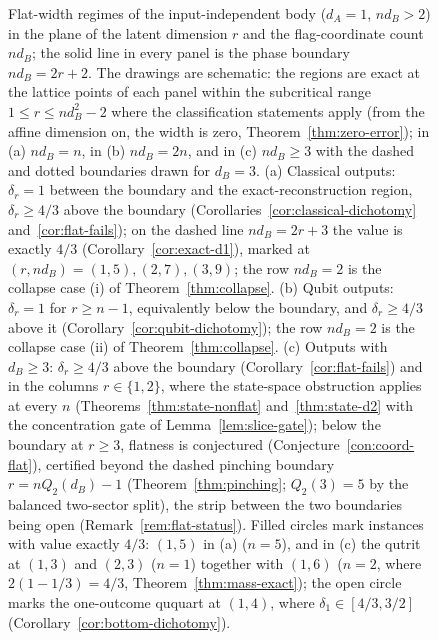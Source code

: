 \documentclass[11pt,a4paper]{article}
\begin{document}
\begin{figure}[t]
\caption{Flat-width regimes of the input-independent body ($d_A=1$, $nd_B>2$) in the plane of the latent dimension $r$ and the flag-coordinate count $nd_B$; the solid line in every panel is the phase boundary $nd_B=2r+2$. The drawings are schematic: the regions are exact at the lattice points of each panel within the subcritical range $1\le r\le nd_B^2-2$ where the classification statements apply (from the affine dimension on, the width is zero, Theorem~\ref{thm:zero-error}); in (a) $nd_B=n$, in (b) $nd_B=2n$, and in (c) $nd_B\ge3$ with the dashed and dotted boundaries drawn for $d_B=3$. (a) Classical outputs: $\delta_r=1$ between the boundary and the exact-reconstruction region, $\delta_r\ge4/3$ above the boundary (Corollaries~\ref{cor:classical-dichotomy} and~\ref{cor:flat-fails}); on the dashed line $nd_B=2r+3$ the value is exactly $4/3$ (Corollary~\ref{cor:exact-d1}), marked at $(r,nd_B)=(1,5),(2,7),(3,9)$; the row $nd_B=2$ is the collapse case (i) of Theorem~\ref{thm:collapse}. (b) Qubit outputs: $\delta_r=1$ for $r\ge n-1$, equivalently below the boundary, and $\delta_r\ge4/3$ above it (Corollary~\ref{cor:qubit-dichotomy}); the row $nd_B=2$ is the collapse case (ii) of Theorem~\ref{thm:collapse}. (c) Outputs with $d_B\ge3$: $\delta_r\ge4/3$ above the boundary (Corollary~\ref{cor:flat-fails}) and in the columns $r\in\{1,2\}$, where the state-space obstruction applies at every $n$ (Theorems~\ref{thm:state-nonflat} and~\ref{thm:state-d2} with the concentration gate of Lemma~\ref{lem:slice-gate}); below the boundary at $r\ge3$, flatness is conjectured (Conjecture~\ref{con:coord-flat}), certified beyond the dashed pinching boundary $r=nQ_2(d_B)-1$ (Theorem~\ref{thm:pinching}; $Q_2(3)=5$ by the balanced two-sector split), the strip between the two boundaries being open (Remark~\ref{rem:flat-status}). Filled circles mark instances with value exactly $4/3$: $(1,5)$ in (a) ($n=5$), and in (c) the qutrit at $(1,3)$ and $(2,3)$ ($n=1$) together with $(1,6)$ ($n=2$, where $2(1-1/3)=4/3$, Theorem~\ref{thm:mass-exact}); the open circle marks the one-outcome ququart at $(1,4)$, where $\delta_1\in[4/3,3/2]$ (Corollary~\ref{cor:bottom-dichotomy}).}
\label{fig:flat-regimes}
\end{figure}
\end{document}
